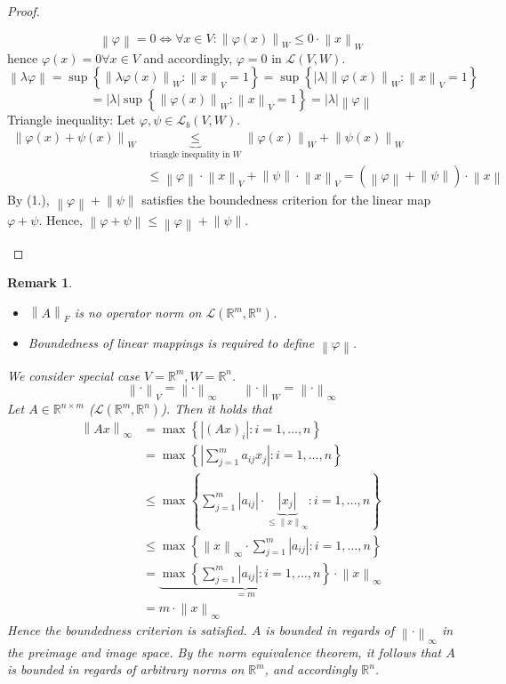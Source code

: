 \documentclass{article}
\newtheorem{remark}{Remark}  \numberwithin{remark}{section}
\newcommand{\set}[1]{\left\{#1\right\}}
\newcommand{\norm}[1]{\left\|#1\right\|}
\newcommand{\card}[1]{\left|#1\right|}
\begin{document}
\begin{proof}
\begin{enumerate}
      \[ \norm\varphi = 0 \iff \forall x \in V: \norm{\varphi(x)}_W \leq 0 \cdot \norm{x}_W \]
      hence $\varphi(x) = 0 \forall x \in V$ and accordingly, $\varphi = 0$ in $\mathcal L(V, W)$.
      \[ \norm{\lambda \varphi} = \sup\set{\norm{\lambda \varphi(x)}_W: \norm{x}_V = 1} = \sup\set{\card{\lambda} \norm{\varphi(x)}_W: \norm{x}_V = 1} \]
      \[ = \card{\lambda} \sup\set{\norm{\varphi(x)}_W: \norm{x}_V = 1} = \card{\lambda} \norm{\varphi} \]
      Triangle inequality:
      Let $\varphi, \psi \in \mathcal L_b(V,W)$.
      \begin{align*}
        \norm{\varphi(x) + \psi(x)}_W
          &\underbrace{\leq}_{\text{triangle inequality in } W} \norm{\varphi(x)}_W + \norm{\psi(x)}_W \\
          &\leq \norm \varphi \cdot \norm{x}_V + \norm \psi \cdot \norm{x}_V = (\norm{\varphi} + \norm{\psi}) \cdot \norm{x}
      \end{align*}
      By (1.), $\norm{\varphi} + \norm{\psi}$ satisfies the boundedness criterion for the linear map $\varphi + \psi$.
      Hence, $\norm{\varphi + \psi} \leq \norm{\varphi} + \norm{\psi}$.
  \end{enumerate}
\end{proof}

\begin{remark}
  \begin{itemize}
    \item $\norm{A}_F$ is no operator norm on $\mathcal L(\mathbb R^m, \mathbb R^n)$.
    \item Boundedness of linear mappings is required to define $\norm{\varphi}$.
  \end{itemize}
  We consider special case $V = \mathbb R^m, W = \mathbb R^n$.
  \[ \norm{\cdot}_V = \norm{\cdot}_\infty \qquad \norm{\cdot}_W = \norm{\cdot}_\infty \]
  Let $A \in \mathbb R^{n\times m}$ ($\mathcal L(\mathbb R^m, \mathbb R^n)$).
  Then it holds that
  \begin{align*}
    \norm{Ax}_\infty
      &= \max\set{\card{(Ax)_i}: i = 1, \dots, n} \\
      &= \max\set{\card{\sum_{j=1}^m a_{ij} x_j}: i = 1, \dots, n} \\
      &\leq \max\set{\sum_{j=1}^m \card{a_{ij}} \cdot \underbrace{\card{x_j}}_{\leq \norm{x}_{\infty}}: i = 1, \dots, n} \\
      &\leq \max\set{\norm{x}_\infty \cdot \sum_{j=1}^m \card{a_{ij}}: i = 1, \dots, n} \\
      &= \underbrace{\max\set{\sum_{j=1}^m \card{a_{ij}}: i = 1, \dots, n}}_{= m} \cdot \norm{x}_\infty \\
      &= m \cdot \norm{x}_\infty
  \end{align*}
  Hence the boundedness criterion is satisfied.
  $A$ is bounded in regards of $\norm{\cdot}_\infty$ in the preimage and image space.
  By the norm equivalence theorem, it follows that $A$ is bounded in regards of arbitrary norms on $\mathbb R^m$, and accordingly $\mathbb R^n$.
\end{remark}
\end{document}

